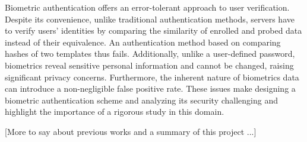 


Biometric authentication offers an error-tolerant approach to user verification. Despite its convenience, unlike traditional authentication methods, servers have to verify users' identities by comparing the similarity of enrolled and probed data instead of their equivalence. An authentication method based on comparing hashes of two templates thus fails. Additionally, unlike a user-defined password, biometrics reveal sensitive personal information and cannot be changed, raising significant privacy concerns. Furthermore, the inherent nature of biometrics data can introduce a non-negligible false positive rate. These issues make designing a biometric authentication scheme and analyzing its security challenging and highlight the importance of a rigorous study in this domain.

[More to say about previous works and a summary of this project ...]

